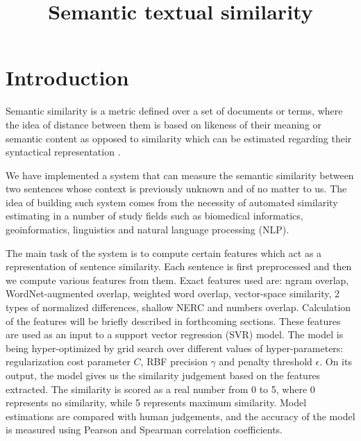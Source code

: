 \documentclass[10pt, a4paper]{article}
\title{Semantic textual similarity}
\begin{document}
\maketitleabstract

\section{Introduction}



Semantic similarity is a metric defined over a set of documents or terms, where the idea of distance between them is based on likeness of their meaning or semantic content as opposed to similarity which can be estimated regarding their syntactical representation \citep{wiki_semantic}.

We have implemented a system that can measure the semantic similarity between two sentences whose context is previously unknown and of no matter to us. The idea of building such system comes from the necessity of automated similarity estimating in a number of study fields such as biomedical informatics, geoinformatics, linguistics and natural language processing (NLP).

The main task of the system is to compute certain features which act as a representation of sentence similarity. Each sentence is first preprocessed and then we compute various features from them. Exact features used are: ngram overlap, WordNet-augmented overlap, weighted word overlap, vector-space similarity, 2 types of normalized differences, shallow NERC and numbers overlap. Calculation of the features will be briefly described in forthcoming sections. These features are used as an input to a support vector regression (SVR) model. The model is being hyper-optimized by grid search over different values of hyper-parameters: regularization cost parameter $C$, RBF precision $\gamma$ and penalty threshold $\epsilon$. On its output, the model gives us the similarity judgement based on the features extracted. The similarity is scored as a real number from 0 to 5, where 0 represents no similarity, while 5 represents maximum similarity. Model estimations are compared with human judgements, and the accuracy of the model is measured using Pearson and Spearman correlation coefficients.
\end{document}
